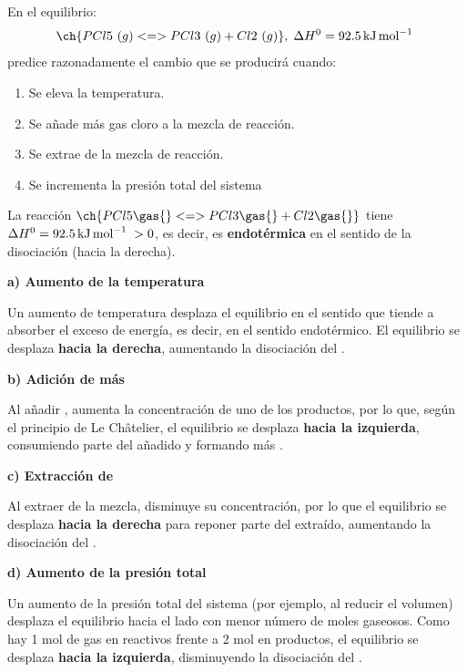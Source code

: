 \begin{exerciseEVAU}
    En el equilibrio:
    \begin{equation*}
        \ch{PCl5\ (g) <=> PCl3\ (g) + Cl2\ (g)},\; \Delta H^0 = \energia[kjmol]{92,5}
    \end{equation*}
    predice razonadamente el cambio que se producirá cuando:
    \begin{enumerate}[label=\letraminuscula]
\item Se eleva la temperatura.
\item Se añade más gas cloro a la mezcla de reacción.
\item Se extrae  de la mezcla de reacción.
\item Se incrementa la presión total del sistema
    \end{enumerate}

    \begin{solu}

        La reacción \(\ch{PCl5 \gas{} <=> PCl3 \gas{} + Cl2 \gas{}}\) tiene \(\Delta H^0 = \energia[kjmol]{92.5} > 0\), es decir, es \textbf{endotérmica} en el sentido de la disociación (hacia la derecha).

        \textbf{a) Aumento de la temperatura}

        Un aumento de temperatura desplaza el equilibrio en el sentido que tiende a absorber el exceso de energía, es decir, en el sentido endotérmico. El equilibrio se desplaza \textbf{hacia la derecha}, aumentando la disociación del .

        \textbf{b) Adición de más }

        Al añadir , aumenta la concentración de uno de los productos, por lo que, según el principio de Le Châtelier, el equilibrio se desplaza \textbf{hacia la izquierda}, consumiendo parte del  añadido y formando más .

        \textbf{c) Extracción de }

        Al extraer  de la mezcla, disminuye su concentración, por lo que el equilibrio se desplaza \textbf{hacia la derecha} para reponer parte del  extraído, aumentando la disociación del .

        \textbf{d) Aumento de la presión total}

        Un aumento de la presión total del sistema (por ejemplo, al reducir el volumen) desplaza el equilibrio hacia el lado con menor número de moles gaseosos. Como hay 1 mol de gas en reactivos frente a 2 mol en productos, el equilibrio se desplaza \textbf{hacia la izquierda}, disminuyendo la disociación del .

    \end{solu}
\end{exerciseEVAU}

